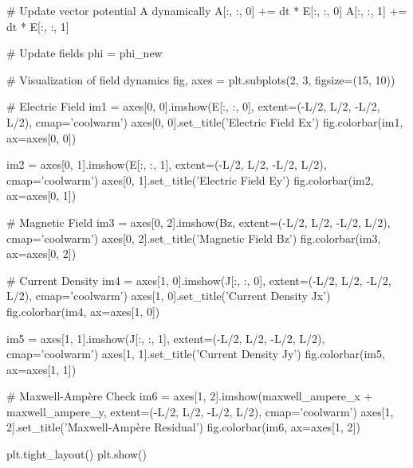     # Update vector potential A dynamically
    A[:, :, 0] += dt * E[:, :, 0]
    A[:, :, 1] += dt * E[:, :, 1]

    # Update fields
    phi = phi_new

# Visualization of field dynamics
fig, axes = plt.subplots(2, 3, figsize=(15, 10))

# Electric Field
im1 = axes[0, 0].imshow(E[:, :, 0], extent=(-L/2, L/2, -L/2, L/2), cmap='coolwarm')
axes[0, 0].set_title('Electric Field Ex')
fig.colorbar(im1, ax=axes[0, 0])

im2 = axes[0, 1].imshow(E[:, :, 1], extent=(-L/2, L/2, -L/2, L/2), cmap='coolwarm')
axes[0, 1].set_title('Electric Field Ey')
fig.colorbar(im2, ax=axes[0, 1])

# Magnetic Field
im3 = axes[0, 2].imshow(Bz, extent=(-L/2, L/2, -L/2, L/2), cmap='coolwarm')
axes[0, 2].set_title('Magnetic Field Bz')
fig.colorbar(im3, ax=axes[0, 2])

# Current Density
im4 = axes[1, 0].imshow(J[:, :, 0], extent=(-L/2, L/2, -L/2, L/2), cmap='coolwarm')
axes[1, 0].set_title('Current Density Jx')
fig.colorbar(im4, ax=axes[1, 0])

im5 = axes[1, 1].imshow(J[:, :, 1], extent=(-L/2, L/2, -L/2, L/2), cmap='coolwarm')
axes[1, 1].set_title('Current Density Jy')
fig.colorbar(im5, ax=axes[1, 1])

# Maxwell-Ampère Check
im6 = axes[1, 2].imshow(maxwell_ampere_x + maxwell_ampere_y, extent=(-L/2, L/2, -L/2, L/2), cmap='coolwarm')
axes[1, 2].set_title('Maxwell-Ampère Residual')
fig.colorbar(im6, ax=axes[1, 2])

plt.tight_layout()
plt.show()